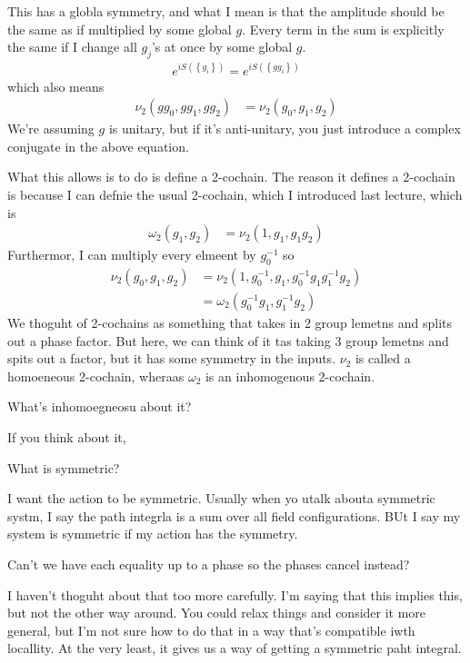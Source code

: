 This has a globla symmetry,
and what I mean is that the amplitude should be the same as if multiplied by
some global $g$.
Every term in the sum is explicitly the same if I change all $g_j$'s at once by
some global $g$.
\begin{align}
    e^{iS\left( \left\{ g_i \right\} \right)}
    =
    e^{iS\left( \left\{ gg_i \right\} \right)}
\end{align}
which also means
\begin{align}
    \nu_2\left( gg_0, gg_1, gg_2 \right) &=
    \nu_2\left( g_0, g_1, g_2 \right)
\end{align}
We're assuming $g$ is unitary,
but if it's anti-unitary,
you just introduce a complex conjugate in the above equation.

What this allows is to do is define a 2-cochain.
The reason it defines a 2-cochain is because I can defnie the usual 2-cochain,
which I introduced last lecture,
which is
\begin{align}
    \omega_2(g_1, g_2) &=
    \nu_2 (1, g_1, g_1 g_2)
\end{align}
Furthermor,
I can multiply every elmeent by $g_0^{-1}$ so
\begin{align}
    \nu_2 (g_0, g_1, g_2) &=
    \nu_2 \left( 
    1, g_0^{-1},g_1, g_{0}^{-1} g_1 g_1^{-1} g_2
    \right)\\
    &= \omega_2\left( g_0^{-1} g_1, g_1^{-1} g_2 \right)
\end{align}
We thoguht of 2-cochains as something that takes in 2 group lemetns and splits
out a phase factor.
But here,
we can think of it tas taking 3 group lemetns and spits out a factor,
but it has some symmetry in the inputs.
$\nu_2$ is called a homoeneous 2-cochain,
wheraas $\omega_2$ is an inhomogenous 2-cochain.

\begin{question}
    What's inhomoegneosu about it?
\end{question}
If you think about it,

\begin{question}
    What is symmetric?
\end{question}
I want the action to be symmetric.
Usually when yo utalk abouta symmetric systm,
I say the path integrla is a sum over all field configurations.
BUt I say my system is symmetric if my action has the symmetry.

\begin{question}
    Can't we have each equality up to a phase
    so the phases cancel instead?
\end{question}
I haven't thoguht about that too more carefully.
I'm saying that this implies this,
but not the other way around.
You could relax things and consider it more general,
but I'm not sure how to do that in a way that's compatible iwth locallity.
At the very least,
it gives us a way of getting a symmetric paht integral.

